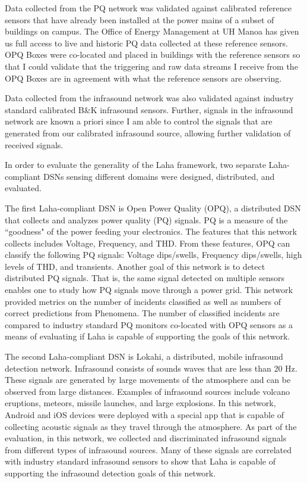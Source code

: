 Data collected from the PQ network was validated against calibrated reference sensors that have already been installed at the power mains of a subset of buildings on campus. The Office of Energy Management at UH Manoa has given us full access to live and historic PQ data collected at these reference sensors. OPQ Boxes were co-located and placed in buildings with the reference sensors so that I could validate that the triggering and raw data streams I receive from the OPQ Boxes are in agreement with what the reference sensors are observing.

Data collected from the infrasound network was also validated against industry standard calibrated B\&K infrasound sensors. Further, signals in the infrasound network are known a priori since I am able to control the signals that are generated from our calibrated infrasound source, allowing further validation of received signals.

In order to evaluate the generality of the Laha framework, two separate Laha-compliant DSNs sensing different domains were designed, distributed, and evaluated.

The first Laha-compliant DSN is Open Power Quality (OPQ), a distributed DSN that collects and analyzes power quality (PQ) signals. PQ is a measure of the ``goodness" of the power feeding your electronics. The features that this network collects includes Voltage, Frequency, and THD. From these features, OPQ can classify the following PQ signals: Voltage dips/swells, Frequency dips/swells, high levels of THD, and transients. Another goal of this network is to detect distributed PQ signals. That is, the same signal detected on multiple sensors enables one to study how PQ signals move through a power grid. This network provided metrics on the number of incidents classified as well as numbers of correct predictions from Phenomena. The number of classified incidents are compared to industry standard PQ monitors co-located with OPQ sensors as a means of evaluating if Laha is capable of supporting the goals of this network.

The second Laha-compliant DSN is Lokahi, a distributed, mobile infrasound detection network. Infrasound consists of sounds waves that are less than 20 Hz. These signals are generated by large movements of the atmosphere and can be observed from large distances. Examples of infrasound sources include volcano eruptions, meteors, missile launches, and large explosions. In this network, Android and iOS devices were deployed with a special app that is capable of collecting acoustic signals as they travel through the atmosphere. As part of the evaluation, in this network, we collected and discriminated infrasound signals from different types of infrasound sources. Many of these signals are correlated with industry standard infrasound sensors to show that Laha is capable of supporting the infrasound detection goals of this network.


